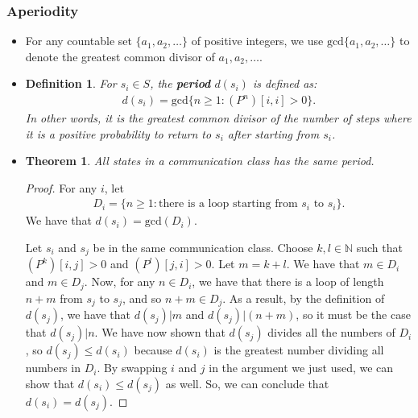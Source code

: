 \documentclass[10pt]{article}
\newtheorem{theorem}[lemma]{Theorem}
\newtheorem{definition}[lemma]{Definition}
\newcommand{\mrm}[1]{\mathrm{#1}}
\begin{document}
\subsubsection{Aperiodity}

\begin{itemize}
  \item For any countable set $\{a_1, a_2, \dotsc \}$ of positive integers, we use $\mrm{gcd}\{ a_1, a_2, \dotsc \}$ to denote the greatest common divisor of $a_1, a_2, \dotsc$.
  
  \item \begin{definition}
    For $s_i \in S$, the {\bf period} $d(s_i)$ is defined as:
    \begin{align*}
        d(s_i) = \mrm{gcd} \{ n \geq 1 : (P^n)[i,i] > 0 \}.
    \end{align*}
    In other words, it is the greatest common divisor of the number of steps where it is a positive probability to return to $s_i$ after starting from $s_i$.
  \end{definition}

  \item \begin{theorem}
    All states in a communication class has the same period.
  \end{theorem}

  \begin{proof}
    For any $i$, let
    \begin{align*}
        D_i = \{ n \geq 1 : \mbox{there is a loop starting from $s_i$ to $s_i$} \}.
    \end{align*}
    We have that $d(s_i) = \mrm{gcd}(D_i).$
    
    Let $s_i$ and $s_j$ be in the same communication class. Choose $k, l \in \mathbb{N}$ such that $(P^k)[i,j] > 0$ and $(P^l)[j,i] > 0$. Let $m = k + l$. We have that $m \in D_i$ and $m \in D_j$. Now, for any $n \in D_i$, we have that there is a loop of length $n+m$ from $s_j$ to $s_j$, and so $n+m \in D_j$. As a result, by the definition of $d(s_j)$, we have that $d(s_j) | m$ and $d(s_j) | (n+m)$, so it must be the case that $d(s_j) | n$. We have now shown that $d(s_j)$ divides all the numbers of $D_i$, so $d(s_j) \leq d(s_i)$ because $d(s_i)$ is the greatest number dividing all numbers in $D_i$. By swapping $i$ and $j$ in the argument we just used, we can show that $d(s_i) \leq d(s_j)$ as well. So, we can conclude that $d(s_i) = d(s_j)$.
  \end{proof}


\end{itemize}
\end{document}
